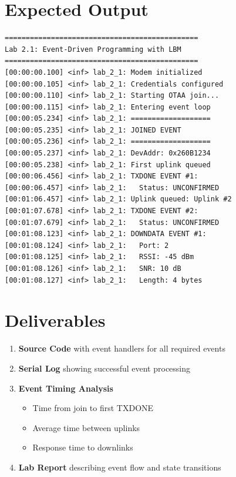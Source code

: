 \documentclass[11pt,a4paper]{article}
\begin{document}
\section{Expected Output}

\begin{lstlisting}
==============================================
Lab 2.1: Event-Driven Programming with LBM
==============================================
[00:00:00.100] <inf> lab_2_1: Modem initialized
[00:00:00.105] <inf> lab_2_1: Credentials configured
[00:00:00.110] <inf> lab_2_1: Starting OTAA join...
[00:00:00.115] <inf> lab_2_1: Entering event loop
[00:00:05.234] <inf> lab_2_1: ===================
[00:00:05.235] <inf> lab_2_1: JOINED EVENT
[00:00:05.236] <inf> lab_2_1: ===================
[00:00:05.237] <inf> lab_2_1: DevAddr: 0x260B1234
[00:00:05.238] <inf> lab_2_1: First uplink queued
[00:00:06.456] <inf> lab_2_1: TXDONE EVENT #1:
[00:00:06.457] <inf> lab_2_1:   Status: UNCONFIRMED
[00:01:06.457] <inf> lab_2_1: Uplink queued: Uplink #2
[00:01:07.678] <inf> lab_2_1: TXDONE EVENT #2:
[00:01:07.679] <inf> lab_2_1:   Status: UNCONFIRMED
[00:01:08.123] <inf> lab_2_1: DOWNDATA EVENT #1:
[00:01:08.124] <inf> lab_2_1:   Port: 2
[00:01:08.125] <inf> lab_2_1:   RSSI: -45 dBm
[00:01:08.126] <inf> lab_2_1:   SNR: 10 dB
[00:01:08.127] <inf> lab_2_1:   Length: 4 bytes
\end{lstlisting}

\section{Deliverables}

\begin{enumerate}[itemsep=10pt]
    \item \textbf{Source Code} with event handlers for all required events
    \item \textbf{Serial Log} showing successful event processing
    \item \textbf{Event Timing Analysis}
    \begin{itemize}
        \item Time from join to first TXDONE
        \item Average time between uplinks
        \item Response time to downlinks
    \end{itemize}
    \item \textbf{Lab Report} describing event flow and state transitions
\end{enumerate}
\end{document}
